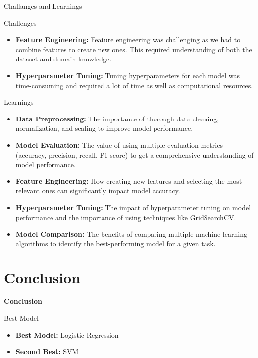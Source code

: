 \documentclass[14pt, aspectratio=169]{beamer}
\begin{document}
\begin{frame}[allowframebreaks]{Challanges and Learnings}
  \begin{block}{Challenges}
  \begin{itemize}
    \setlength\itemsep{1em}
    \item \textbf{Feature Engineering:} Feature engineering was challenging as we had to combine features to create new ones. This required understanding of both the dataset and domain knowledge.
    \item \textbf{Hyperparameter Tuning:} Tuning hyperparameters for each model was time-consuming and required a lot of time as well as computational resources.
  \end{itemize}
  \end{block}
  \footnotesize
  \begin{block}{Learnings}
    \begin{itemize}
      \item \textbf{Data Preprocessing:} The importance of thorough data cleaning, normalization, and scaling to improve model performance.
      \item \textbf{Model Evaluation:} The value of using multiple evaluation metrics (accuracy, precision, recall, F1-score) to get a comprehensive understanding of model performance.
      \item \textbf{Feature Engineering:} How creating new features and selecting the most relevant ones can significantly impact model accuracy.
      \item \textbf{Hyperparameter Tuning:} The impact of hyperparameter tuning on model performance and the importance of using techniques like GridSearchCV.
      \item \textbf{Model Comparison:} The benefits of comparing multiple machine learning algorithms to identify the best-performing model for a given task.
    \end{itemize}
  \end{block}
\end{frame}

\section{Conclusion}
\begin{frame}{}
  \Huge
  \centering
  \textbf{Conclusion}
  \normalsize
\end{frame}
\begin{frame}{Best Model}
  \begin{itemize}
    \setlength\itemsep{1em}
    \item \textbf{Best Model:} Logistic Regression
    \item \textbf{Second Best:} SVM
  \end{itemize}
\end{frame}
\end{document}
